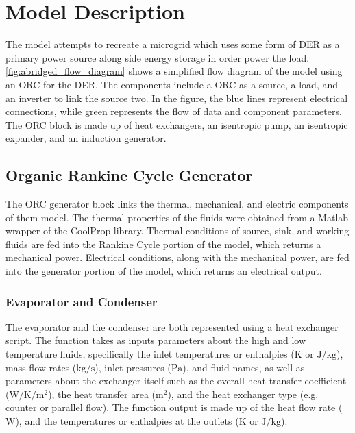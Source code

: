 \chapter{Model Description}
\label{ch:model}

The model attempts to recreate a microgrid which uses some form of DER as a primary power source along side energy storage in order power the load. \autoref{fig:abridged_flow_diagram} shows a simplified flow diagram of the model using an ORC for the DER. The components include a ORC as a source, a load, and an inverter to link the source two. In the figure, the blue lines represent electrical connections, while green represents the flow of data and component parameters. The ORC block is made up of heat exchangers, an isentropic pump, an isentropic expander, and an induction generator. 
\begin{comment}
The load block \verb|one line description of load|. 
The energy storage block \verb|one line description of energy storage|. 
The inverter block \verb|one line description of inverter|.
\end{comment}


\section{Organic Rankine Cycle Generator}
The ORC generator block links the thermal, mechanical, and electric components of them model. The thermal properties of the fluids were obtained from a Matlab wrapper of the CoolProp library. \cite{Bell2014} Thermal conditions of source, sink, and working fluids are fed into the Rankine Cycle portion of the model, which returns a mechanical power. Electrical conditions, along with the mechanical power, are fed into the generator portion of the model, which returns an electrical output.  

\subsection{Evaporator and Condenser}
The evaporator and the condenser are both represented using a heat exchanger script.  The function takes as inputs parameters about the high and low temperature fluids, specifically the inlet temperatures or enthalpies ($\si{\kelvin}$ or $\si{\joule\per\kilogram}$), mass flow rates ($\si{\kilogram\per\second} $), inlet pressures ($\si{\pascal}$), and fluid names, as well as parameters about the exchanger itself such as the overall heat transfer coefficient ($\si{\watt\per\kelvin\per\meter\squared}$), the heat transfer area ($\si{\meter\squared}$), and the heat exchanger type (e.g. counter or parallel flow). The function output is made up of the heat flow rate ($\si{\watt}$), and the temperatures or enthalpies at the outlets ($\si{\kelvin}$ or $\si{\joule\per\kilogram}$). 

